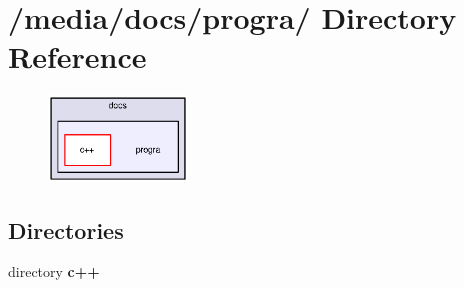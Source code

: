 \section{/media/docs/progra/ Directory Reference}
\label{dir_000002}


\begin{figure}[H]
\begin{center}
\leavevmode
\includegraphics[width=105pt]{dir_000002_dep}
\end{center}
\end{figure}
\subsection*{Directories}
\begin{CompactItemize}
\item 
directory {\bf c++}
\end{CompactItemize}
